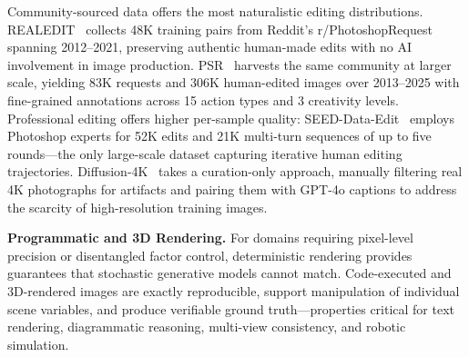 Community-sourced data offers the most naturalistic editing distributions. REALEDIT~\citep{sushko2025realedit} collects 48K training pairs from Reddit's r/PhotoshopRequest spanning 2012--2021, preserving authentic human-made edits with no AI involvement in image production. PSR~\citep{taesiri2025understanding} harvests the same community at larger scale, yielding 83K requests and 306K human-edited images over 2013--2025 with fine-grained annotations across 15 action types and 3 creativity levels. Professional editing offers higher per-sample quality: SEED-Data-Edit~\citep{ge2024seed} employs Photoshop experts for 52K edits and 21K multi-turn sequences of up to five rounds---the only large-scale dataset capturing iterative human editing trajectories. Diffusion-4K~\citep{zhang2025diffusion} takes a curation-only approach, manually filtering real 4K photographs for artifacts and pairing them with GPT-4o captions to address the scarcity of high-resolution training images.

\textbf{Programmatic and 3D Rendering.}
For domains requiring pixel-level precision or disentangled factor control, deterministic rendering provides guarantees that stochastic generative models cannot match. Code-executed and 3D-rendered images are exactly reproducible, support manipulation of individual scene variables, and produce verifiable ground truth---properties critical for text rendering, diagrammatic reasoning, multi-view consistency, and robotic simulation.

